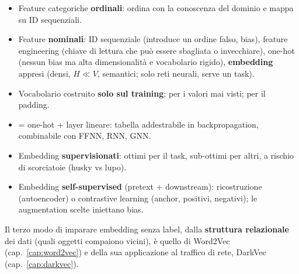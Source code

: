 \begin{sintesi}
\begin{itemize}
  \item Feature categoriche \textbf{ordinali}: ordina con la conoscenza del dominio e mappa su ID sequenziali.
  \item Feature \textbf{nominali}: ID sequenziale (introduce un ordine falso, bias), feature engineering (chiave di lettura che può essere
        sbagliata o invecchiare), one-hot (nessun bias ma alta dimensionalità e vocabolario rigido), \textbf{embedding} appresi (densi,
        $H \ll V$, semantici; solo reti neurali, serve un task).
  \item Vocabolario costruito \textbf{solo sul training};  per i valori mai visti;  per il padding.
  \item {} = one-hot + layer lineare: tabella addestrabile in backpropagation, combinabile con FFNN, RNN, GNN.
  \item Embedding \textbf{supervisionati}: ottimi per il task, sub-ottimi per altri, a rischio di scorciatoie (husky vs lupo).
  \item Embedding \textbf{self-supervised} (pretext + downstream): ricostruzione (autoencoder) o contrastive learning (anchor, positivi,
        negativi); le augmentation scelte iniettano bias.
\end{itemize}
\end{sintesi}
Il terzo modo di imparare embedding senza label, dalla \textbf{struttura relazionale} dei dati (quali oggetti compaiono vicini), è
quello di Word2Vec (cap.~\ref{cap:word2vec}) e della sua applicazione al traffico di rete, DarkVec (cap.~\ref{cap:darkvec}).

